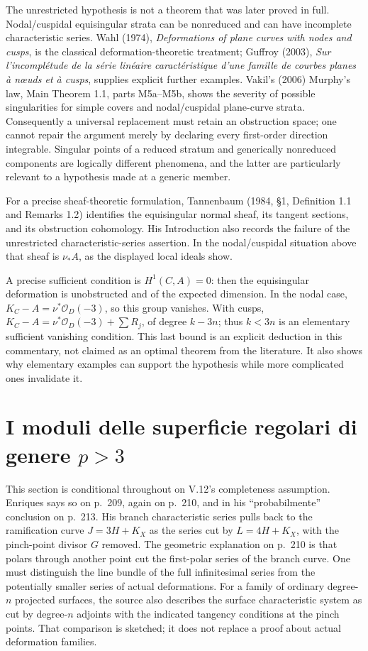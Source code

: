 The unrestricted hypothesis is not a theorem that was later proved in full. Nodal/cuspidal equisingular strata can be nonreduced and can have incomplete characteristic series. Wahl (1974), \emph{Deformations of plane curves with nodes and cusps}, is the classical deformation-theoretic treatment; Guffroy (2003), \emph{Sur l'incomplétude de la série linéaire caractéristique d'une famille de courbes planes à nœuds et à cusps}, supplies explicit further examples. Vakil's (2006) Murphy's law, Main Theorem 1.1, parts M5a--M5b, shows the severity of possible singularities for simple covers and nodal/cuspidal plane-curve strata. Consequently a universal replacement must retain an obstruction space; one cannot repair the argument merely by declaring every first-order direction integrable. Singular points of a reduced stratum and generically nonreduced components are logically different phenomena, and the latter are particularly relevant to a hypothesis made at a generic member.

For a precise sheaf-theoretic formulation, Tannenbaum (1984, §1, Definition 1.1 and Remarks 1.2) identifies the equisingular normal sheaf, its tangent sections, and its obstruction cohomology. His Introduction also records the failure of the unrestricted characteristic-series assertion. In the nodal/cuspidal situation above that sheaf is \(\nu_*A\), as the displayed local ideals show.

A precise sufficient condition is \(H^1(C,A)=0\): then the equisingular deformation is unobstructed and of the expected dimension. In the nodal case, \(K_C-A=\nu^*\mathcal O_D(-3)\), so this group vanishes. With cusps, \(K_C-A=\nu^*\mathcal O_D(-3)+\sum R_j\), of degree \(k-3n\); thus \(k<3n\) is an elementary sufficient vanishing condition. This last bound is an explicit deduction in this commentary, not claimed as an optimal theorem from the literature. It also shows why elementary examples can support the hypothesis while more complicated ones invalidate it.

\section[I moduli delle superficie regolari]{I moduli delle superficie regolari di genere \texorpdfstring{$p>3$}{p > 3}}
\label{cp1-v-13}

This section is conditional throughout on V.12's completeness assumption. Enriques says so on p.~209, again on p.~210, and in his ``probabilmente'' conclusion on p.~213. His branch characteristic series pulls back to the ramification curve \(J=3H+K_X\) as the series cut by \(L=4H+K_X\), with the pinch-point divisor \(G\) removed. The geometric explanation on p.~210 is that polars through another point cut the first-polar series of the branch curve. One must distinguish the line bundle of the full infinitesimal series from the potentially smaller series of actual deformations. For a family of ordinary degree-\(n\) projected surfaces, the source also describes the surface characteristic system as cut by degree-\(n\) adjoints with the indicated tangency conditions at the pinch points. That comparison is sketched; it does not replace a proof about actual deformation families.

